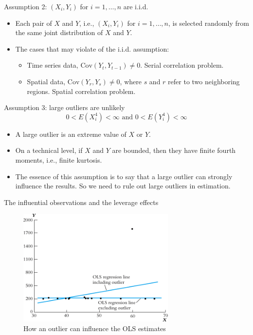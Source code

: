 \documentclass[presentation]{beamer}
\begin{document}
\begin{frame}[label={sec:org33198a9}]{Assumption 2: \((X_i, Y_i)\) for \(i = 1, \ldots, n\) are i.i.d.}
\begin{itemize}
\item Each pair of \(X\) and \(Y\), i.e., \((X_i, Y_i)\) for \(i=1, \ldots, n\), is
selected randomly from the same joint distribution of \(X\) and \(Y\).

\item The cases that may violate of the i.i.d. assumption:
\begin{itemize}
\item Time series data, \(\mathrm{Cov}(Y_t, Y_{t-1}) \neq 0\). Serial
correlation problem.
\item Spatial data, \(\mathrm{Cov}(Y_r, Y_s) \neq 0\), where \(s\) and \(r\)
refer to two neighboring regions. Spatial correlation problem.
\end{itemize}
\end{itemize}
\end{frame}

\begin{frame}[label={sec:org1ff894b}]{Assumption 3: large outliers are unlikely}
$$0 < E(X^4_i) < \infty \text{ and } 0 < E(Y_i^4) < \infty$$

\begin{itemize}
\item A large outlier is an extreme value of \(X\) or \(Y\).
\item On a technical level, if \(X\) and \(Y\) are bounded, then they have finite
fourth moments, i.e., finite kurtosis.
\item The essence of this assumption is to say that a large outlier can
strongly influence the results. So we need to rule out large
outliers in estimation.
\end{itemize}
\end{frame}

\begin{frame}[label={sec:orgdd4b775}]{The influential observations and the leverage effects}
\begin{figure}[htbp]
\centering
\includegraphics[width=0.7\textwidth]{figure/fig-4-5.png}
\caption{\label{fig:org01e1b35}
How an outlier can influence the OLS estimates}
\end{figure}
\end{frame}
\end{document}
